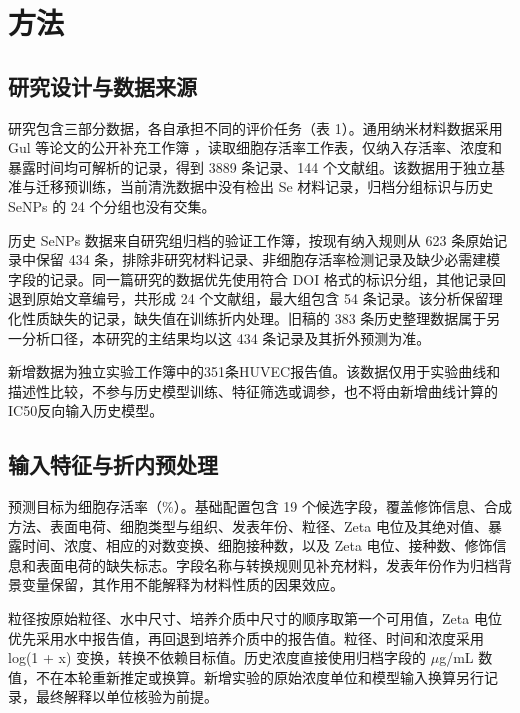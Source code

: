 \section{方法}

\subsection{研究设计与数据来源}

研究包含三部分数据，各自承担不同的评价任务（表 1）。通用纳米材料数据采用 Gul 等论文的公开补充工作簿 \cite{gul2021association}，读取细胞存活率工作表，仅纳入存活率、浓度和暴露时间均可解析的记录，得到 3889 条记录、144 个文献组。该数据用于独立基准与迁移预训练，当前清洗数据中没有检出 Se 材料记录，归档分组标识与历史 SeNPs 的 24 个分组也没有交集。

历史 SeNPs 数据来自研究组归档的验证工作簿，按现有纳入规则从 623 条原始记录中保留 434 条，排除非研究材料记录、非细胞存活率检测记录及缺少必需建模字段的记录。同一篇研究的数据优先使用符合 DOI 格式的标识分组，其他记录回退到原始文章编号，共形成 24 个文献组，最大组包含 54 条记录。该分析保留理化性质缺失的记录，缺失值在训练折内处理。旧稿的 383 条历史整理数据属于另一分析口径，本研究的主结果均以这 434 条记录及其折外预测为准。

新增数据为独立实验工作簿中的351条HUVEC报告值。该数据仅用于实验曲线和描述性比较，不参与历史模型训练、特征筛选或调参，也不将由新增曲线计算的IC50反向输入历史模型。

\begin{table}[H]
\centering
\caption{三部分数据的分析范围与用途。记录数不等同于独立材料数或实验重复数。}
\label{tab:data_scope}
\small

\end{table}

\subsection{输入特征与折内预处理}

预测目标为细胞存活率（\%）。基础配置包含 19 个候选字段，覆盖修饰信息、合成方法、表面电荷、细胞类型与组织、发表年份、粒径、Zeta 电位及其绝对值、暴露时间、浓度、相应的对数变换、细胞接种数，以及 Zeta 电位、接种数、修饰信息和表面电荷的缺失标志。字段名称与转换规则见补充材料，发表年份作为归档背景变量保留，其作用不能解释为材料性质的因果效应。

粒径按原始粒径、水中尺寸、培养介质中尺寸的顺序取第一个可用值，Zeta 电位优先采用水中报告值，再回退到培养介质中的报告值。粒径、时间和浓度采用 log(1 + x) 变换，转换不依赖目标值。历史浓度直接使用归档字段的 \ensuremath{\mu}g/mL 数值，不在本轮重新推定或换算。新增实验的原始浓度单位和模型输入换算另行记录，最终解释以单位核验为前提。

